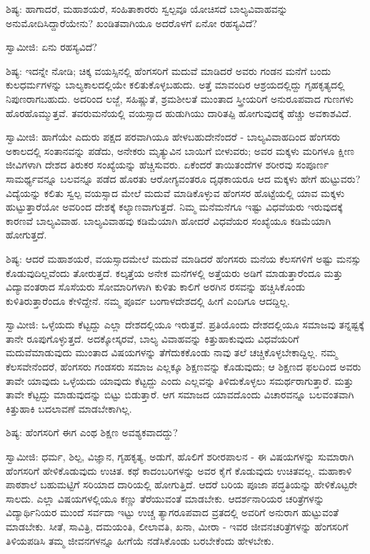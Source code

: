 ಶಿಷ್ಯ: ಹಾಗಾದರೆ, ಮಹಾಶಯರೆ, ಸಂಹಿತಾಕಾರರು ಸ್ವಲ್ಪವೂ ಯೋಚಿಸದೆ ಬಾಲ್ಯವಿವಾಹವನ್ನು ಅನುಮೋದಿಸಿದ್ದಾರೆಯೇನು? ಖಂಡಿತವಾಗಿಯೂ ಅದರೊಳಗೆ ಏನೋ ರಹಸ್ಯವಿದೆ?

ಸ್ವಾಮೀಜಿ: ಏನು ರಹಸ್ಯವಿದೆ?

ಶಿಷ್ಯ: ಇದನ್ನೇ ನೋಡಿ; ಚಿಕ್ಕ ವಯಸ್ಸಿನಲ್ಲಿ ಹೆಂಗಸರಿಗೆ ಮದುವೆ ಮಾಡಿದರೆ ಅವರು ಗಂಡನ ಮನೆಗೆ ಬಂದು ಕುಲಧರ್ಮಗಳನ್ನು ಬಾಲ್ಯಕಾಲದಲ್ಲಿಯೇ ಕಲಿತುಕೊಳ್ಳಬಹುದು. ಅತ್ತೆ ಮಾವಂದಿರ ಆಶ್ರಯದಲ್ಲಿದ್ದು ಗೃಹಕೃತ್ಯದಲ್ಲಿ ನಿಪುಣರಾಗಬಹುದು. ಅದರಿಂದ ಲಜ್ಜೆ, ಸಹಿಷ್ಣುತೆ, ಶ್ರಮಶೀಲತೆ ಮುಂತಾದ ಸ್ತ್ರೀಯರಿಗೆ ಅನುರೂಪವಾದ ಗುಣಗಳು ಹೊರಹೊಮ್ಮುತ್ತವೆ. ತವರುಮನೆಯಲ್ಲಿ ವಯಸ್ಸಾದ ಹುಡುಗಿಯು ದಾರಿತಪ್ಪಿ ಹೋಗುವುದಕ್ಕೆ ಹೆಚ್ಚು ಅವಕಾಶವಿದೆ.

ಸ್ವಾಮೀಜಿ: ಹಾಗೆಯೇ ಎದುರು ಪಕ್ಷದ ಪರವಾಗಿಯೂ ಹೇಳಬಹುದೇನೆಂದರೆ - ಬಾಲ್ಯವಿವಾಹದಿಂದ ಹೆಂಗಸರು ಅಕಾಲದಲ್ಲಿ ಸಂತಾನವನ್ನು ಪಡೆದು, ಅನೇಕರು ಮೃತ್ಯುವಿನ ಬಾಯಿಗೆ ಬೀಳುವರು; ಅವರ ಮಕ್ಕಳು ಮರಿಗಳೂ ಕ್ಷೀಣ ಜೀವಿಗಳಾಗಿ ದೇಶದ ತಿರುಕರ ಸಂಖ್ಯೆಯನ್ನು ಹೆಚ್ಚಿಸುವರು. ಏಕೆಂದರೆ ತಾಯಿತಂದೆಗಳ ಶರೀರವು ಸಂಪೂರ್ಣ ಸಾಮರ್ಥ್ಯವನ್ನೂ ಬಲವನ್ನೂ ಪಡೆದ ಹೊರತು ಆರೋಗ್ಯವಂತರೂ ದೃಢಕಾಯರೂ ಆದ ಮಕ್ಕಳು ಹೇಗೆ ಹುಟ್ಟುವರು? ವಿದ್ಯೆಯನ್ನು ಕಲಿತು ಸ್ವಲ್ಪ ವಯಸ್ಸಾದ ಮೇಲೆ ಮದುವೆ ಮಾಡಿಕೊಳ್ಳುವ ಹೆಂಗಸರ ಹೊಟ್ಟೆಯಲ್ಲಿ ಯಾವ ಮಕ್ಕಳು ಹುಟ್ಟುತ್ತಾರೆಯೋ ಅವರಿಂದ ದೇಶಕ್ಕೆ ಕಲ್ಯಾಣವಾಗುತ್ತದೆ. ನಿಮ್ಮ ಮನೆಮನೆಗೂ ಇಷ್ಟು ವಿಧವೆಯರು ಇರುವುದಕ್ಕೆ ಕಾರಣವೆ ಬಾಲ್ಯವಿವಾಹ. ಬಾಲ್ಯವಿವಾಹವು ಕಡಿಮೆಯಾಗಿ ಹೋದರೆ ವಿಧವೆಯರ ಸಂಖ್ಯೆಯೂ ಕಡಿಮೆಯಾಗಿ ಹೋಗುತ್ತದೆ.

ಶಿಷ್ಯ: ಆದರೆ ಮಹಾಶಯರೆ, ವಯಸ್ಸಾದಮೇಲೆ ಮದುವೆ ಮಾಡಿದರೆ ಹೆಂಗಸರು ಮನೆಯ ಕೆಲಸಗಳಿಗೆ ಅಷ್ಟು ಮನಸ್ಸು ಕೊಡುವುದಿಲ್ಲವೆಂದು ತೋರುತ್ತದೆ. ಕಲ್ಕತ್ತೆಯ ಅನೇಕ ಮನೆಗಳಲ್ಲಿ ಅತ್ತೆಯರು ಅಡಿಗೆ ಮಾಡುತ್ತಾರೆಂದೂ ಮತ್ತು ವಿದ್ಯಾವಂತರಾದ ಸೊಸೆಯರು ಸೋಮಾರಿಗಳಾಗಿ ಕುಳಿತು ಕಾಲಿಗೆ ಅರಗಿನ ರಸವನ್ನು ಹಚ್ಚಿಸಿಕೊಂಡು ಕುಳಿತಿರುತ್ತಾರೆಂದೂ ಕೇಳಿದ್ದೇನೆ. ನಮ್ಮ ಪೂರ್ವ ಬಂಗಾಳದೇಶದಲ್ಲಿ ಹೀಗೆ ಎಂದಿಗೂ ಆದದ್ದಿಲ್ಲ.

ಸ್ವಾಮೀಜಿ: ಒಳ್ಳೆಯದು ಕೆಟ್ಟದ್ದು ಎಲ್ಲಾ ದೇಶದಲ್ಲಿಯೂ ಇರುತ್ತವೆ. ಪ್ರತಿಯೊಂದು ದೇಶದಲ್ಲಿಯೂ ಸಮಾಜವು ತನ್ನಷ್ಟಕ್ಕೆ ತಾನೇ ರೂಪುಗೊಳ್ಳುತ್ತದೆ. ಅದಕ್ಕೋಸ್ಕರವೆ, ಬಾಲ್ಯ ವಿವಾಹವನ್ನು ಕಿತ್ತುಹಾಕುವುದು ವಿಧವೆಯರಿಗೆ ಮದುವೆಮಾಡುವುದು ಮುಂತಾದ ವಿಷಯಗಳನ್ನು ತೆಗೆದುಕಕೊಂಡು ನಾವು ತಲೆ ಚಚ್ಚಿಕೊಳ್ಳಬೇಕಾದ್ದಿಲ್ಲ. ನಮ್ಮ ಕೆಲಸವೇನೆಂದರೆ, ಹೆಂಗಸರು ಗಂಡಸರು ಸಮಾಜ ಎಲ್ಲಕ್ಕೂ ಶಿಕ್ಷಣವನ್ನು ಕೊಡುವುದು; ಆ ಶಿಕ್ಷಣದ ಫಲದಿಂದ ಅವರು ತಾವೇ ಯಾವುದು ಒಳ್ಳೆಯದು ಯಾವುದು ಕೆಟ್ಟದ್ದು ಎಂದು ಎಲ್ಲವನ್ನು ತಿಳಿದುಕೊಳ್ಳಲು ಸಮರ್ಥರಾಗುತ್ತಾರೆ. ಮತ್ತು ತಾವೇ ಕೆಟ್ಟದ್ದು ಮಾಡುವುದನ್ನು ಬಿಟ್ಟು ಬಿಡುತ್ತಾರೆ. ಆಗ ಸಮಾಜದ ಯಾವದೊಂದು ವಿಚಾರವನ್ನೂ ಬಲವಂತವಾಗಿ ಕಿತ್ತುಹಾಕಿ ಬದಲಾವಣೆ ಮಾಡಬೇಕಾಗಿಲ್ಲ.

ಶಿಷ್ಯ: ಹೆಂಗಸರಿಗೆ ಈಗ ಎಂಥ ಶಿಕ್ಷಣ ಅವಶ್ಯಕವಾದದ್ದು?

ಸ್ವಾಮೀಜಿ: ಧರ್ಮ, ಶಿಲ್ಪ, ವಿಜ್ಞಾನ, ಗೃಹಕೃತ್ಯ, ಅಡುಗೆ, ಹೊಲಿಗೆ ಶರೀರಪಾಲನ - ಈ ವಿಷಯಗಳನ್ನು ಸುಮಾರಾಗಿ ಹೆಂಗಸರಿಗೆ ಹೇಳಿಕೊಡುವುದು ಉಚಿತ. ಕಥೆ ಕಾದಂಬರಿಗಳನ್ನು ಅವರ ಕೈಗೆ ಕೊಡುವುದು ಉಚಿತವಲ್ಲ. ಮಹಾಕಾಳಿ ಪಾಠಶಾಲೆ ಬಹುಮಟ್ಟಿಗೆ ಸರಿಯಾದ ದಾರಿಯಲ್ಲಿ ಹೋಗುತ್ತಿದೆ. ಆದರೆ ಬರಿಯ ಪೂಜಾ ಪದ್ಧತಿಯನ್ನು ಹೇಳಿಕೊಟ್ಟರೇ ಸಾಲದು. ಎಲ್ಲಾ ವಿಷಯಗಳಲ್ಲಿಯೂ ಕಣ್ಣು ತೆರೆಯುವಂತೆ ಮಾಡಬೇಕು. ಆದರ್ಶನಾರಿಯರ ಚರಿತ್ರೆಗಳನ್ನು ವಿದ್ಯಾರ್ಥಿನಿಯರ ಮುಂದೆ ಸರ್ವದಾ ಇಟ್ಟು ಉಚ್ಚ ತ್ಯಾಗರೂಪವಾದ ವ್ರತದಲ್ಲಿ ಅವರಿಗೆ ಅನುರಾಗ ಹುಟ್ಟುವಂತೆ ಮಾಡಬೇಕು. ಸೀತೆ, ಸಾವಿತ್ರಿ, ದಮಯಂತಿ, ಲೀಲಾವತಿ, ಖನಾ, ಮೀರಾ - ಇವರ ಜೀವನಚರಿತ್ರೆಗಳನ್ನು ಹೆಂಗಸರಿಗೆ ತಿಳಿಯಪಡಿಸಿ ತಮ್ಮ ಜೀವನಗಳನ್ನೂ ಹೀಗೆಯೆ ನಡೆಸಿಕೊಂಡು ಬರಬೇಕೆಂದು ಹೇಳಬೇಕು.

